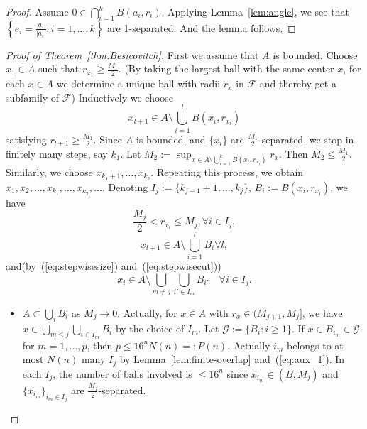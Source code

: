 \begin{proof}
    Assume $0 \in \bigcap _{i=1}^{k}B(a_{i},r_{i})$. Applying Lemma~\ref{lem:angle}, we see that $\left\{  e_{i}= \frac{a_{i}}{\lvert a_{i} \rvert}:i=1,\dots,k  \right\}$ are 1-separated. And the lemma follows.
\end{proof}

\begin{proof}[Proof of Theorem~\ref{thm:Besicovitch}]
First we assume that $A$ is bounded. Choose $x_{1} \in A$ such that $r_{x_{1}}\geq \frac{M_{1}}{2}$. (By taking the largest ball with the same center $x$, for each $x \in A$ we determine a unique ball with radii $r_{x}$ in $\mathscr{F}$ and thereby get a subfamily of $\mathscr{F}$) Inductively we choose
$$
x_{l+1} \in A\setminus \bigcup _{i=1}^{l}B(x_{i},r_{x_{i}})
$$
satisfying $r_{l+1}\geq \frac{M_{1}}{2}$. Since $A$ is bounded, and $\{ x_{i} \}$ are $\frac{M_{1}}{2}$-separated, we stop in finitely many steps, say $k_{1}$.
Let $M_{2}:= \sup_{x \in A\setminus \bigcup _{i=1}^{k}B(x_{i},r_{x_{i}})}r_{x}$. Then $M_{2}\leq \frac{M_{1}}{2}$. Similarly, we choose $x_{k_{1}+1},\dots,x_{k_{2}}$. Repeating this process, we obtain $x_{1},x_{2},\dots,x_{k_{1}},\dots,x_{k_{2}},\dots$. Denoting $I_{j}:=\{ k_{j-1}+1,\dots,k_{j} \}$, $B_{i}:=B(x_{i},r_{x_{i}})$, we have
\begin{equation}
    \label{eq:stepwisesize}
    \frac{M_{j}}{2}  < r_{x_{i}}\leq M_{j},  \forall i\in I_{j},
\end{equation}
\begin{equation}
    \label{eq:stepwisecut}
    x_{l+1}  \in A\setminus \bigcup _{i=1}^{l}B_{i}  \forall l,
\end{equation}
and(by~(\ref{eq:stepwisesize}) and~(\ref{eq:stepwisecut}))
\begin{equation}
    \label{eq:aux_1}
    x_{i} \in A\setminus \bigcup _{m\neq j}\bigcup _{i'\in I_{m}}B_{i'}\quad\forall i \in I_{j}.
\end{equation}
\begin{itemize}
    \item[(i)] $A \subset \bigcup _{i}B_{i}$ as $M_{j}\to 0$. Actually, for $x \in A$ with $r_{x}\in(M_{j+1},M_{j}]$, we have $x \in \bigcup _{m \leq j}\bigcup _{i \in I_{m}}B_{i}$ by the choice of $I_{m}$. Let $\mathscr{G}:=\{ B_{i}:i\geq 1 \}$. If $x \in B_{i_{m}}\in \mathscr{G}$ for $m=1,\dots,p$, then $p\leq 16^{n}N(n)=:P(n)$. Actually $i_{m}$ belongs to at most $N(n)$ many $I_{j}$ by Lemma~\ref{lem:finite-overlap} and~(\ref{eq:aux_1}). In each $I_{j}$, the number of balls involved is $\leq 16^{n}$ since $x_{i_{m}}\in(B,M_{j})$ and $\{ x_{i_{m}} \}_{i_{m}\in I_{j}}$ are $\frac{M_{j}}{2}$-separated.

\end{itemize}
\end{proof}

